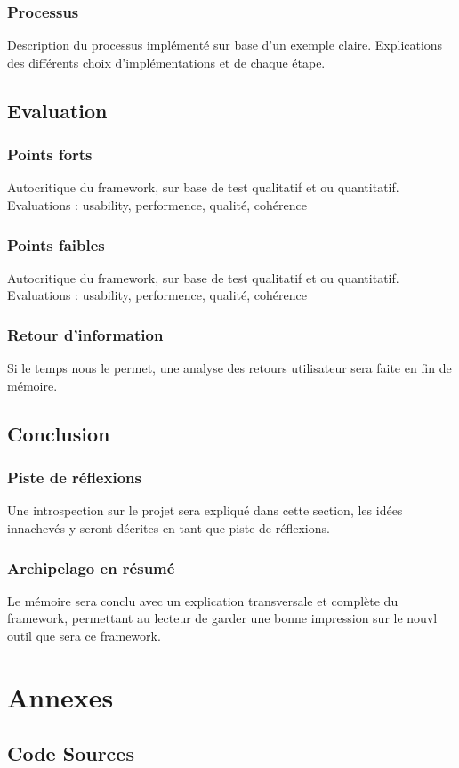 \documentclass[a4paper,12pt,twoside, fleqn]{report}
\begin{document}
\section{Processus}
Description du processus implémenté sur base d'un exemple claire. Explications des différents choix d'implémentations et de chaque étape.
\chapter{Evaluation}
\section{Points forts}
Autocritique du framework, sur base de test qualitatif et ou quantitatif. Evaluations : usability, performence, qualité, cohérence
\section{Points faibles}
Autocritique du framework, sur base de test qualitatif et ou quantitatif.
Evaluations : usability, performence, qualité, cohérence
\section{Retour d'information}
Si le temps nous le permet, une analyse des retours utilisateur sera faite en fin de mémoire.
\chapter{Conclusion}
\section{Piste de réflexions}
Une introspection sur le projet sera expliqué dans cette section, les idées innachevés y seront décrites en tant que piste de réflexions.
\section{Archipelago en résumé}
Le mémoire sera conclu avec un explication transversale et complète du framework, permettant au lecteur de garder une bonne impression sur le nouvl outil que sera ce framework.
\part{Annexes}
\chapter{Code Sources}
\end{document}
